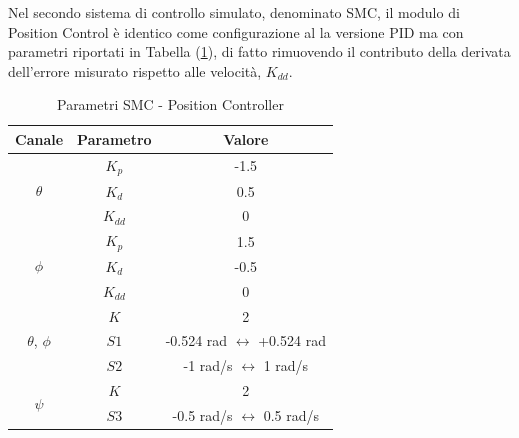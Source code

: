 Nel secondo sistema di controllo simulato, denominato SMC, il modulo di Position Control è identico come configurazione al la versione PID ma con parametri riportati in Tabella (\ref{tab:SMCPOS}), di fatto rimuovendo il contributo della derivata dell'errore misurato rispetto alle velocità, $K_{dd}$.

\begin{table}
	\centering
	\begin{tabular}{c c c}
		\hline
		Canale & Parametro & Valore \\
		\hline
		\multirow{3}{*}{$\theta$}&$K_p$ & -1.5 \\
		&$K_d$ & 0.5\\
		&$K_{dd}$ & 0\\
		\hline
		\multirow{3}{*}{$\phi$}& $K_p$ & 1.5 \\
		&$K_d$ & -0.5\\
		&$K_{dd}$ & 0\\
		\hline
		\multirow{3}{*}{$\theta$, $\phi$}&$K$ & 2 \\ 
		&$S1$ & -0.524 rad $\leftrightarrow$ +0.524 rad\\
		&$S2$ & -1 rad/s $\leftrightarrow$ 1  rad/s\\
		\hline
		\multirow{2}{*}{$\psi$}&$K$ & 2 \\
		&$S3$ & -0.5 rad/s $\leftrightarrow$ 0.5 rad/s\\
		\hline		
	\end{tabular}	
	\caption{Parametri SMC - Position Controller}
	\label{tab:SMCPOS}
\end{table}


